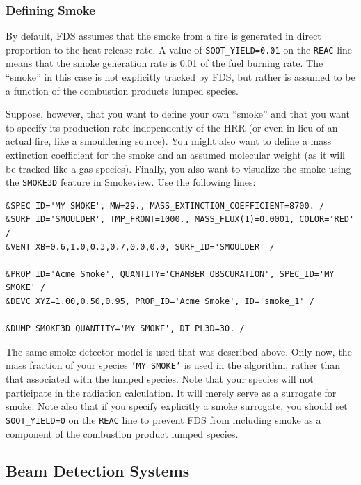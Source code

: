 \documentclass[11pt]{book}
\newcommand{\ct}{\tt\small}
\begin{document}
\subsubsection{Defining Smoke}
\label{info:alternative_smoke}

By default, FDS assumes that the smoke from a fire is generated in direct proportion to the heat release rate. A value
of {\ct SOOT\_YIELD=0.01} on the {\ct REAC} line means that the smoke generation rate is 0.01 of the fuel burning rate. The
``smoke'' in this case is not explicitly tracked by FDS, but rather is assumed to be a function of the combustion products lumped species.

Suppose, however, that you want to define your own ``smoke'' and that you want to specify its production rate independently of
the HRR (or even in lieu of an actual fire, like a smouldering source). You might also want to define a mass extinction coefficient for the
smoke and an assumed molecular weight (as it will be tracked like a gas species). Finally, you also want to visualize the smoke using
the {\ct SMOKE3D} feature in Smokeview. Use the following lines:

\footnotesize
\begin{verbatim}
&SPEC ID='MY SMOKE', MW=29., MASS_EXTINCTION_COEFFICIENT=8700. /
&SURF ID='SMOULDER', TMP_FRONT=1000., MASS_FLUX(1)=0.0001, COLOR='RED' /
&VENT XB=0.6,1.0,0.3,0.7,0.0,0.0, SURF_ID='SMOULDER' /

&PROP ID='Acme Smoke', QUANTITY='CHAMBER OBSCURATION', SPEC_ID='MY SMOKE' /
&DEVC XYZ=1.00,0.50,0.95, PROP_ID='Acme Smoke', ID='smoke_1' /

&DUMP SMOKE3D_QUANTITY='MY SMOKE', DT_PL3D=30. /
\end{verbatim}

\normalsize
\noindent
The same smoke detector model is used that was described above. Only now, the mass fraction of your species {\ct 'MY SMOKE'} is used in the
algorithm, rather than that associated with the lumped species. Note that your species will not participate in the radiation calculation. It
will merely serve as a surrogate for smoke. Note also that if you specify explicitly a smoke surrogate, you should set {\ct SOOT\_YIELD=0} on the
{\ct REAC} line to prevent FDS from including smoke as a component of the combustion product lumped species.



\subsection{Beam Detection Systems}
\label{info:beam_detector}
\end{document}

